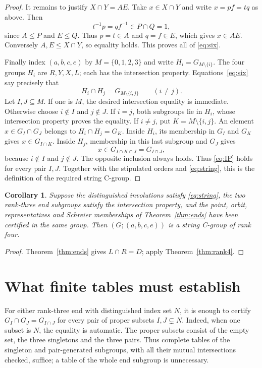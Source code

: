\documentclass[11pt]{article}
\newtheorem{corollary}[theorem]{Corollary}
\theoremstyle{remark}
\begin{document}
\begin{proof}
It remains to justify $X\cap Y=AE$. Take $x\in X\cap Y$ and write
$x=pf=tq$ as above. Then
\[
 t^{-1}p=qf^{-1}\in P\cap Q=1,
\]
since $A\leq P$ and $E\leq Q$. Thus $p=t\in A$ and $q=f\in E$,
which gives $x\in AE$. Conversely $A,E\leq X\cap Y$, so equality
holds. This proves all of \eqref{eq:six}.

Finally index $(a,b,c,e)$ by $M=\{0,1,2,3\}$ and write
$H_i=G_{M\setminus\{i\}}$. The four groups $H_i$ are $R,Y,X,L$;
each has the intersection property. Equations~\eqref{eq:six} say precisely
that
\begin{equation}\label{eq:maximal}
 H_i\cap H_j=G_{M\setminus\{i,j\}}\qquad(i\ne j).
\end{equation}
Let $I,J\subseteq M$. If one is $M$, the desired intersection equality
is immediate. Otherwise choose $i\notin I$ and $j\notin J$.
If $i=j$, both subgroups lie in $H_i$, whose intersection property proves
the equality. If $i\ne j$, put $K=M\setminus\{i,j\}$.
An element $x\in G_I\cap G_J$ belongs to $H_i\cap H_j=G_K$.
Inside $H_i$, its membership in $G_I$ and $G_K$ gives
$x\in G_{I\cap K}$. Inside $H_j$, membership in this last subgroup and
$G_J$ gives
\[
 x\in G_{I\cap K\cap J}=G_{I\cap J},
\]
because $i\notin I$ and $j\notin J$. The opposite inclusion always
holds. Thus \eqref{eq:IP} holds for every pair $I,J$.
Together with the stipulated orders and \eqref{eq:string}, this is the
definition of the required string C-group.
\end{proof}

\begin{corollary}\label{cor:combined}
Suppose the distinguished involutions satisfy \eqref{eq:string}, the two
rank-three end subgroups satisfy the intersection property, and the point,
orbit, representatives and Schreier memberships of
Theorem~\ref{thm:ends} have been certified in the same group.
Then $(G;(a,b,c,e))$ is a string C-group of rank four.
\end{corollary}

\begin{proof}
Theorem~\ref{thm:ends} gives $L\cap R=D$; apply
Theorem~\ref{thm:rank4}.
\end{proof}

\section{What finite tables must establish}

For either rank-three end with distinguished index set $N$, it is enough
to certify $G_I\cap G_J=G_{I\cap J}$ for every pair of proper subsets
$I,J\subsetneq N$. Indeed, when one subset is $N$, the equality is
automatic. The proper subsets consist of the empty set, the three
singletons and the three pairs. Thus complete tables of the singleton and
pair-generated subgroups, with all their mutual intersections checked,
suffice; a table of the whole end subgroup is unnecessary.
\end{document}

